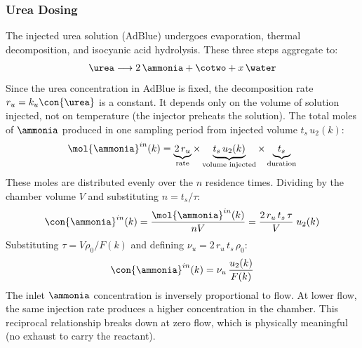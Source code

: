\subsubsection{Urea Dosing}

The injected urea solution (AdBlue) undergoes evaporation, thermal decomposition, and isocyanic acid hydrolysis. These
three steps aggregate to:
\begin{align*}
    \urea \longrightarrow 2\,\ammonia + \cotwo + x\,\water
\end{align*}
Since the urea concentration in AdBlue is fixed, the decomposition rate $r_u = k_u \con{\urea}$ is a constant. It
depends only on the volume of solution injected, not on temperature (the injector preheats the solution). The total
moles of $\ammonia$ produced in one sampling period from injected volume $t_s\,u_2(k)$:
\begin{align}
    \mol{\ammonia}^{in}(k) = \underbrace{2\,r_u}_{\text{rate}}
        \times \underbrace{t_s\,u_2(k)}_{\text{volume injected}}
        \times \underbrace{t_s}_{\text{duration}}
\end{align}
These moles are distributed evenly over the $n$ residence times. Dividing by the chamber volume $V$ and substituting
$n = t_s/\tau$:
\begin{align}
    \con{\ammonia}^{in}(k) = \frac{\mol{\ammonia}^{in}(k)}{nV}
        = \frac{2\,r_u\,t_s\,\tau}{V}\;u_2(k)
\end{align}
Substituting $\tau = V\rho_0/F(k)$ and defining $\nu_u = 2\,r_u\,t_s\,\rho_0$:
\begin{align}
    \con{\ammonia}^{in}(k) = \nu_u\,\frac{u_2(k)}{F(k)}
    \label{eqn::urea_dosing}
\end{align}
The inlet $\ammonia$ concentration is inversely proportional to flow. At lower flow, the same injection rate produces a
higher concentration in the chamber. This reciprocal relationship breaks down at zero flow, which is physically
meaningful (no exhaust to carry the reactant).
